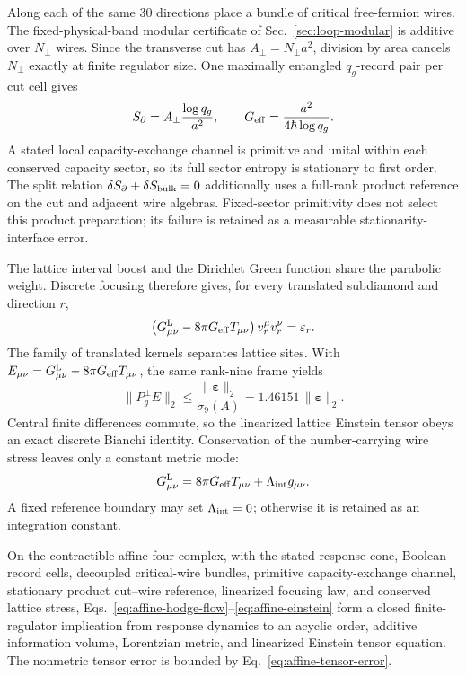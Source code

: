 Along each of the same 30 directions place a bundle of critical
free-fermion wires.  The fixed-physical-band modular certificate of
Sec.~\ref{sec:loop-modular} is additive over \(N_\perp\) wires.  Since the
transverse cut has \(A_\perp=N_\perp a^2\), division by area cancels
\(N_\perp\) exactly at finite regulator size.  One maximally entangled
\(q_g\)-record pair per cut cell gives
\begin{equation}
 S_\partial=A_\perp\frac{\log q_g}{a^2},
 \qquad
 G_{\rm eff}=\frac{a^2}{4\hbar\log q_g}.
 \label{eq:affine-geff}
\end{equation}
A stated local capacity-exchange channel is primitive and unital within each
conserved capacity sector, so its full sector entropy is stationary to first
order.  The split relation
\(\delta S_\partial+\delta S_{\rm bulk}=0\) additionally uses a full-rank
product reference on the cut and adjacent wire algebras.  Fixed-sector
primitivity does not select this product preparation; its failure is retained
as a measurable stationarity-interface error.

The lattice interval boost and the Dirichlet Green function share the
parabolic weight.  Discrete focusing therefore gives, for every translated
subdiamond and direction \(r\),
\begin{equation}
 \left(
 G_{\mu\nu}^{\rm L}-8\pi G_{\rm eff}T_{\mu\nu}
 \right)v_r^\mu v_r^\nu=\varepsilon_r .
 \label{eq:affine-null-equations}
\end{equation}
The family of translated kernels separates lattice sites.  With
\(E_{\mu\nu}=G_{\mu\nu}^{\rm L}-8\pi G_{\rm eff}T_{\mu\nu}\), the same
rank-nine frame yields
\begin{equation}
 \|P_g^\perp E\|_2
 \le\frac{\|\boldsymbol\varepsilon\|_2}{\sigma_9(A)}
 =1.46151\,\|\boldsymbol\varepsilon\|_2 .
 \label{eq:affine-tensor-error}
\end{equation}
Central finite differences commute, so the linearized lattice Einstein
tensor obeys an exact discrete Bianchi identity.  Conservation of the
number-carrying wire stress leaves only a constant metric mode:
\begin{equation}
 G_{\mu\nu}^{\rm L}
 =8\pi G_{\rm eff}T_{\mu\nu}
 +\Lambda_{\rm int}g_{\mu\nu}.
 \label{eq:affine-einstein}
\end{equation}
A fixed reference boundary may set \(\Lambda_{\rm int}=0\); otherwise it is
retained as an integration constant.

\begin{theorem}
\label{thm:affine-model-closure}
On the contractible affine four-complex, with the stated response cone,
Boolean record cells, decoupled critical-wire bundles, primitive
capacity-exchange channel, stationary product cut--wire reference, linearized
focusing law, and conserved lattice stress,
Eqs.~\eqref{eq:affine-hodge-flow}--\eqref{eq:affine-einstein} form a closed
finite-regulator implication from response dynamics to an acyclic order,
additive information volume, Lorentzian metric, and linearized Einstein tensor
equation.  The nonmetric tensor error is bounded by
Eq.~\eqref{eq:affine-tensor-error}.
\end{theorem}

